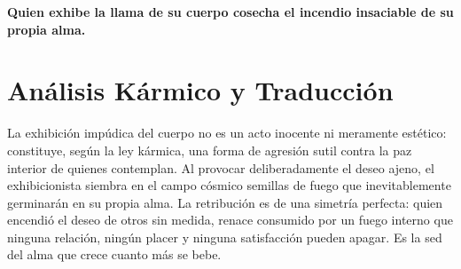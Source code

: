
\vspace{1em}
\begin{center}
    \textbf{\Large Quien exhibe la llama de su cuerpo cosecha el incendio insaciable de su propia alma.}
\end{center}
\vspace{1em}

\section{Análisis Kármico y Traducción}
\begin{figure}
  \vspace{-1.5em}
  \begin{center}
  \end{center}
  \vspace{-1.5em}
\end{figure}
La exhibición impúdica del cuerpo no es un acto inocente ni meramente estético: constituye, según la ley kármica, una forma de agresión sutil contra la paz interior de quienes contemplan. Al provocar deliberadamente el deseo ajeno, el exhibicionista siembra en el campo cósmico semillas de fuego que inevitablemente germinarán en su propia alma. La retribución es de una simetría perfecta: quien encendió el deseo de otros sin medida, renace consumido por un fuego interno que ninguna relación, ningún placer y ninguna satisfacción pueden apagar. Es la sed del alma que crece cuanto más se bebe.

